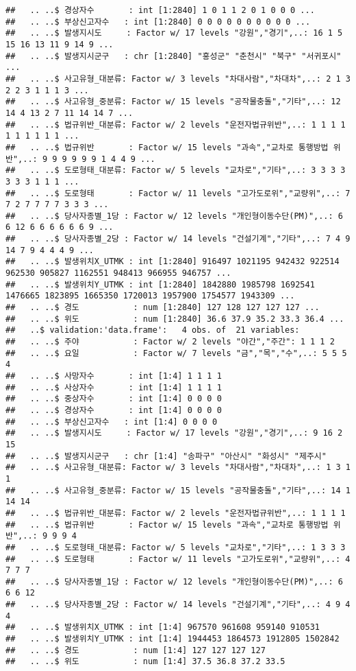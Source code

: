 \documentclass[]{article}
\begin{document}
\begin{verbatim}
##   .. ..$ 경상자수       : int [1:2840] 1 0 1 1 2 0 1 0 0 0 ...
##   .. ..$ 부상신고자수   : int [1:2840] 0 0 0 0 0 0 0 0 0 0 ...
##   .. ..$ 발생지시도     : Factor w/ 17 levels "강원","경기",..: 16 1 5 15 16 13 11 9 14 9 ...
##   .. ..$ 발생지시군구   : chr [1:2840] "홍성군" "춘천시" "북구" "서귀포시" ...
##   .. ..$ 사고유형_대분류: Factor w/ 3 levels "차대사람","차대차",..: 2 1 3 2 2 3 1 1 1 3 ...
##   .. ..$ 사고유형_중분류: Factor w/ 15 levels "공작물충돌","기타",..: 12 14 4 13 2 7 11 14 14 7 ...
##   .. ..$ 법규위반_대분류: Factor w/ 2 levels "운전자법규위반",..: 1 1 1 1 1 1 1 1 1 1 ...
##   .. ..$ 법규위반       : Factor w/ 15 levels "과속","교차로 통행방법 위반",..: 9 9 9 9 9 9 1 4 4 9 ...
##   .. ..$ 도로형태_대분류: Factor w/ 5 levels "교차로","기타",..: 3 3 3 3 3 3 3 1 1 1 ...
##   .. ..$ 도로형태       : Factor w/ 11 levels "고가도로위","교량위",..: 7 7 2 7 7 7 7 3 3 3 ...
##   .. ..$ 당사자종별_1당 : Factor w/ 12 levels "개인형이동수단(PM)",..: 6 6 12 6 6 6 6 6 6 9 ...
##   .. ..$ 당사자종별_2당 : Factor w/ 14 levels "건설기계","기타",..: 7 4 9 14 7 9 4 4 4 9 ...
##   .. ..$ 발생위치X_UTMK : int [1:2840] 916497 1021195 942432 922514 962530 905827 1162551 948413 966955 946757 ...
##   .. ..$ 발생위치Y_UTMK : int [1:2840] 1842880 1985798 1692541 1476665 1823895 1665350 1720013 1957900 1754577 1943309 ...
##   .. ..$ 경도           : num [1:2840] 127 128 127 127 127 ...
##   .. ..$ 위도           : num [1:2840] 36.6 37.9 35.2 33.3 36.4 ...
##   ..$ validation:'data.frame':   4 obs. of  21 variables:
##   .. ..$ 주야           : Factor w/ 2 levels "야간","주간": 1 1 1 2
##   .. ..$ 요일           : Factor w/ 7 levels "금","목","수",..: 5 5 5 4
##   .. ..$ 사망자수       : int [1:4] 1 1 1 1
##   .. ..$ 사상자수       : int [1:4] 1 1 1 1
##   .. ..$ 중상자수       : int [1:4] 0 0 0 0
##   .. ..$ 경상자수       : int [1:4] 0 0 0 0
##   .. ..$ 부상신고자수   : int [1:4] 0 0 0 0
##   .. ..$ 발생지시도     : Factor w/ 17 levels "강원","경기",..: 9 16 2 15
##   .. ..$ 발생지시군구   : chr [1:4] "송파구" "아산시" "화성시" "제주시"
##   .. ..$ 사고유형_대분류: Factor w/ 3 levels "차대사람","차대차",..: 1 3 1 1
##   .. ..$ 사고유형_중분류: Factor w/ 15 levels "공작물충돌","기타",..: 14 1 14 14
##   .. ..$ 법규위반_대분류: Factor w/ 2 levels "운전자법규위반",..: 1 1 1 1
##   .. ..$ 법규위반       : Factor w/ 15 levels "과속","교차로 통행방법 위반",..: 9 9 9 4
##   .. ..$ 도로형태_대분류: Factor w/ 5 levels "교차로","기타",..: 1 3 3 3
##   .. ..$ 도로형태       : Factor w/ 11 levels "고가도로위","교량위",..: 4 7 7 7
##   .. ..$ 당사자종별_1당 : Factor w/ 12 levels "개인형이동수단(PM)",..: 6 6 6 12
##   .. ..$ 당사자종별_2당 : Factor w/ 14 levels "건설기계","기타",..: 4 9 4 4
##   .. ..$ 발생위치X_UTMK : int [1:4] 967570 961608 959140 910531
##   .. ..$ 발생위치Y_UTMK : int [1:4] 1944453 1864573 1912805 1502842
##   .. ..$ 경도           : num [1:4] 127 127 127 127
##   .. ..$ 위도           : num [1:4] 37.5 36.8 37.2 33.5
\end{verbatim}
\end{document}
